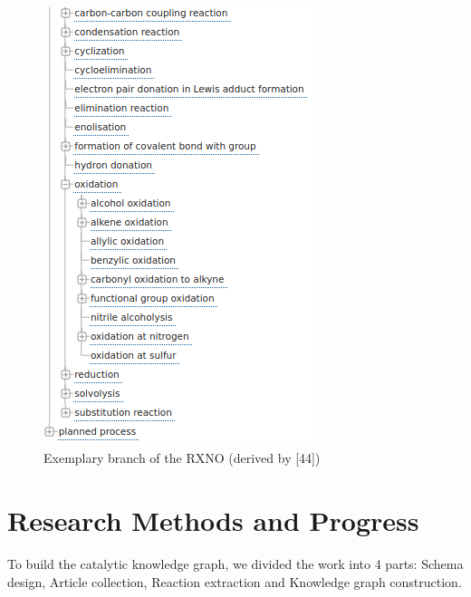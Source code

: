 \documentclass[%
 aip,
 jmp,%
 amsmath,amssymb,
 reprint,%
]{revtex4-2}
\begin{document}
\begin{figure}[htbp]
 \centering
 \includegraphics[width=0.7\textwidth]{figure/12.png}
 \caption{ Exemplary branch of the RXNO (derived by [44])}
 \label{ Fig.12 }
\end{figure}

\section{Research Methods and Progress}

To build the catalytic knowledge graph, we divided the work into 4 parts: Schema design, Article collection, Reaction extraction and Knowledge graph construction.
\end{document}
